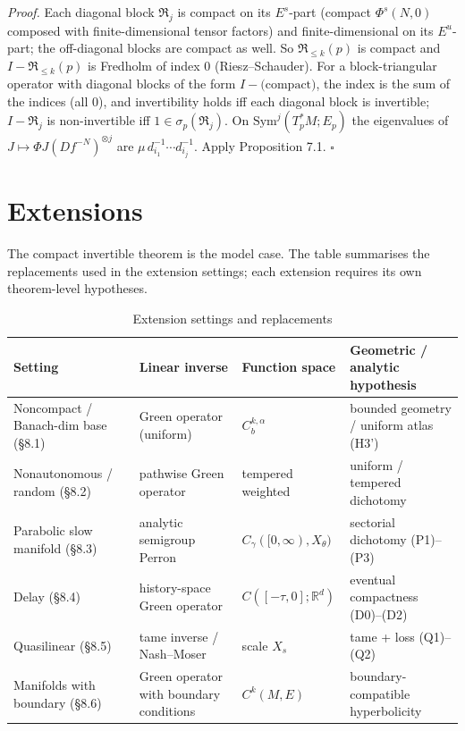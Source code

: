\documentclass[11pt,a4paper]{article}
\theoremstyle{plain}
\theoremstyle{definition}
\theoremstyle{remark}
\numberwithin{equation}{section}
\numberwithin{figure}{section}
\begin{document}
\textit{Proof.} Each diagonal block $\mathfrak R_j$ is compact on its $E^s$-part (compact $\Phi^s(N,0)$ composed with finite-dimensional tensor factors) and finite-dimensional on its $E^u$-part; the off-diagonal blocks are compact as well. So $\mathfrak R_{\le k}(p)$ is compact and $I-\mathfrak R_{\le k}(p)$ is Fredholm of index $0$ (Riesz–Schauder). For a block-triangular operator with diagonal blocks of the form $I-\text{(compact)}$, the index is the sum of the indices (all $0$), and invertibility holds iff each diagonal block is invertible; $I-\mathfrak R_j$ is non-invertible iff $1\in\sigma_p(\mathfrak R_j)$. On $\mathrm{Sym}^j(T^*_pM;E_p)$ the eigenvalues of $J\mapsto\Phi J(Df^{-N})^{\otimes j}$ are $\mu\,d_{i_1}^{-1}\cdots d_{i_j}^{-1}$. Apply Proposition 7.1. $\square$

\section{Extensions}

The compact invertible theorem is the model case. The table summarises the replacements used in the extension settings; each extension requires its own theorem-level hypotheses.

\begin{table}[h]
\centering
\begin{tabular}{l|l|l|l}
\toprule
Setting & Linear inverse & Function space & Geometric / analytic hypothesis\\
\midrule
Noncompact / Banach-dim base (§8.1) & Green operator (uniform) & $C^{k,\alpha}_b$ & bounded geometry / uniform atlas (H3') \\
Nonautonomous / random (§8.2) & pathwise Green operator & tempered weighted & uniform / tempered dichotomy \\
Parabolic slow manifold (§8.3) & analytic semigroup Perron & $C_\gamma([0,\infty),X_\theta)$ & sectorial dichotomy (P1)–(P3) \\
Delay (§8.4) & history-space Green operator & $C([-\tau,0];\mathbb R^d)$ & eventual compactness (D0)–(D2) \\
Quasilinear (§8.5) & tame inverse / Nash–Moser & scale $X_s$ & tame + loss (Q1)–(Q2) \\
Manifolds with boundary (§8.6) & Green operator with boundary conditions & $C^k(M,E)$ & boundary-compatible hyperbolicity \\
\bottomrule
\end{tabular}
\caption{Extension settings and replacements}
\label{tab:extensions}
\end{table}
\end{document}
